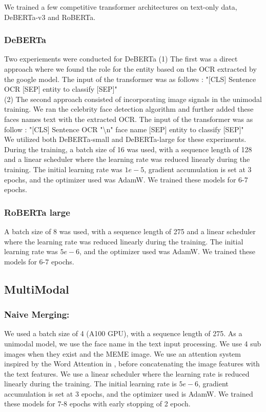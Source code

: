 \documentclass[11pt]{article}
\begin{document}
We trained a few competitive transformer architectures on text-only data, DeBERTa-v3 and RoBERTa.\subsubsection{DeBERTa}
Two experiements were conducted for DeBERTa
(1) The first was a direct approach where we found the role for the entity based on the OCR extracted by the google model. The input of the transformer was as follows : "[CLS] Sentence OCR [SEP] entity to classify [SEP]"\\
(2) The second approach consisted of incorporating image signals in the unimodal training. We ran the celebrity face detection algorithm and further added these faces names text with the extracted OCR.  The input of the transformer was as follow : "[CLS] Sentence OCR "\textbackslash n" face name [SEP] entity to classify [SEP]"\\
We utilized both DeBERTa-small and DeBERTa-large for these experiments.
During the training, a batch size of 16 was used, with a sequence length of 128  and a linear scheduler where the learning rate was reduced linearly during the training. The initial learning rate was $1e-5$, gradient accumulation is set at 3 epochs, and the optimizer used was AdamW. We trained these models for 6-7 epochs.
\subsubsection{RoBERTa large}
A batch size of 8 was used, with a sequence length of 275 and a linear scheduler where the learning rate was reduced linearly during the training. The initial learning rate was $5e-6$, and the optimizer used was AdamW. We trained these models for 6-7 epochs.
\subsection{MultiModal}
\subsubsection{Naive Merging:}
We used a batch size of 4 (A100 GPU), with a sequence length of 275. As a unimodal model, we use the face name in the text input processing. We use 4 sub images when they exist and the MEME image. We use an attention system inspired by the Word Attention in \cite{li2019bidirectional} , before concatenating the image features with the text features. We use a linear scheduler where the learning rate is reduced linearly during the training. The initial learning rate is $5e-6$, gradient accumulation is set at 3 epochs, and the optimizer used is AdamW. We trained these models for 7-8 epochs with early stopping of 2 epoch.
\end{document}
